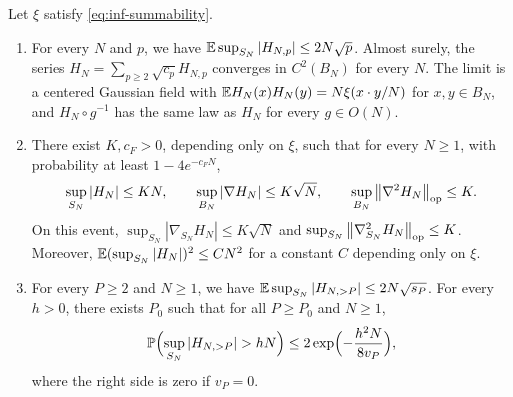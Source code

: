\begin{lemma}\label{lem:inf-field}
Let $\xi$ satisfy \eqref{eq:inf-summability}.
\begin{enumerate}
\item For every $N$ and $p$, we have $\mathbb E\sup_{S_N}|H_{N,p}|\le2N\sqrt p$. Almost surely, the series $H_N=\sum_{p\ge2}\sqrt{c_p}H_{N,p}$ converges in $C^2(B_N)$ for every $N$. The limit is a centered Gaussian field with $\mathbb E H_N(x)H_N(y)=N\xi(x\cdot y/N)$ for $x,y\in B_N$, and $H_N\circ g^{-1}$ has the same law as $H_N$ for every $g\in O(N)$.
\item There exist $K,c_F>0$, depending only on $\xi$, such that for every $N\ge1$, with probability at least $1-4e^{-c_FN}$,
\begin{equation}\label{eq:inf-field-event}
\sup_{S_N}|H_N|\le KN,\qquad \sup_{B_N}|\nabla H_N|\le K\sqrt N,\qquad \sup_{B_N}\left\lVert\nabla^2H_N\right\rVert_{\mathrm{op}}\le K.
\end{equation}
On this event, $\sup_{S_N}|\nabla_{S_N}H_N|\le K\sqrt N$ and $\sup_{S_N}\left\lVert\nabla^2_{S_N}H_N\right\rVert_{\mathrm{op}}\le K$. Moreover, $\mathbb E(\sup_{S_N}|H_N|)^2\le CN^2$ for a constant $C$ depending only on $\xi$.
\item For every $P\ge2$ and $N\ge1$, we have $\mathbb E\sup_{S_N}|H_{N,>P}|\le2N\sqrt{s_P}$. For every $h>0$, there exists $P_0$ such that for all $P\ge P_0$ and $N\ge1$,
\begin{equation}\label{eq:inf-tail}
\Pp\Bigl(\sup_{S_N}|H_{N,>P}|>hN\Bigr)\le2\exp\Bigl(-\frac{h^2N}{8v_P}\Bigr),
\end{equation}
where the right side is zero if $v_P=0$.
\end{enumerate}
\end{lemma}


